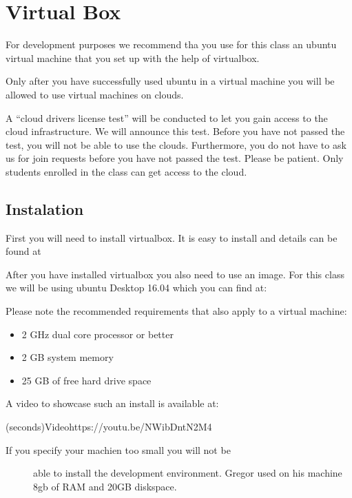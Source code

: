 \FILENAME

\chapter{Virtual Box}
\label{S:virtual-box}

For development purposes we recommend tha you use for this class an
ubuntu virtual machine that you set up with the help of virtualbox.

Only after you have successfully used ubuntu in a virtual machine you
will be allowed to use virtual machines on clouds.

A ``cloud drivers license test'' will be conducted to let you gain
access to the cloud infrastructure. We will announce this test. Before
you have not passed the test, you will not be able to use the clouds.
Furthermore, you do not have to ask us for join requests before you have
not passed the test. Please be patient. Only students enrolled in the
class can get access to the cloud.

\section{Instalation}\label{creation}

First you will need to install virtualbox. It is easy to install and
details can be found at



After you have installed virtualbox you also need to use an image. For
this class we will be using ubuntu Desktop 16.04 which you can find at:



Please note the recommended requirements that also apply to a virtual
machine:

\begin{itemize}
\tightlist
\item
  2 GHz dual core processor or better
\item
  2 GB system memory
\item
  25 GB of free hard drive space
\end{itemize}

A video to showcase such an install is available at:

(seconds){Video}{https://youtu.be/NWibDntN2M4}

\begin{description}
\item[If you specify your machien too small you will not be]
able to install the development environment. Gregor used on his machine
8gb of RAM and 20GB diskspace.
\end{description}


